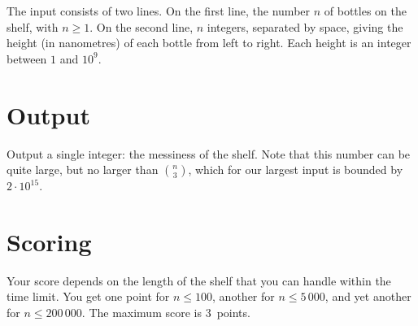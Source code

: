 The input consists of two lines.
On the first line, the number $n$ of bottles on the shelf, with $n\geq 1$.
On the second line, $n$ integers, separated by space, giving the height (in nanometres) of each bottle from left to right.
Each height is an integer between $1$ and $10^9$.

\section*{Output}

Output a single integer: the messiness of the shelf.
Note that this number can be quite large, but no larger than $\binom{n}{3}$, which for our largest input is bounded by $2 \cdot 10^{15}$.

\section*{Scoring}

Your score depends on the length of the shelf that you can handle within the time limit.
You get one point for $n\leq 100$, another for $n\leq 5\,000$, and yet another for $n\leq 200\,000$. 
The maximum score is $3$~points.

